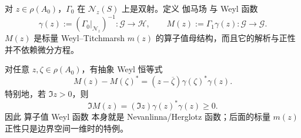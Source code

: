 \begin{definition}
对 $z\in\rho(A_0)$，$\Gamma_0$ 在 $\mathcal N_z(S)$ 上是双射。定义 伽马场 与 Weyl 函数
\begin{equation*}\gamma(z):=(\Gamma_0|_{\mathcal N_z})^{-1}:\mathcal G\to\mathcal H,
 \qquad
 M(z):=\Gamma_1\gamma(z):\mathcal G\to\mathcal G.
\end{equation*}
$M(z)$ 是标量 Weyl--Titchmarsh $m(z)$ 的算子值母结构，而且它的解析与正性并不依赖微分方程。
\end{definition}

\begin{proposition}
对任意 $z,\zeta\in\rho(A_0)$，有抽象 Weyl 恒等式
\begin{equation}\label{eq:math-sl-abstract-weyl-identity}
 M(z)-M(\zeta)^*
 =(z-\overline\zeta)\gamma(\zeta)^*\gamma(z).
\end{equation}
特别地，若 $\Im z>0$，则
\begin{equation}\label{eq:math-sl-operator-weyl-herglotz}
 \Im M(z)
 =(\Im z)\gamma(z)^*\gamma(z)\ge0.
\end{equation}
因此 算子值 Weyl 函数 本身就是 Nevanlinna/Herglotz 函数；后面的标量 $m(z)$ 正性只是边界空间一维时的特例。
\end{proposition}

